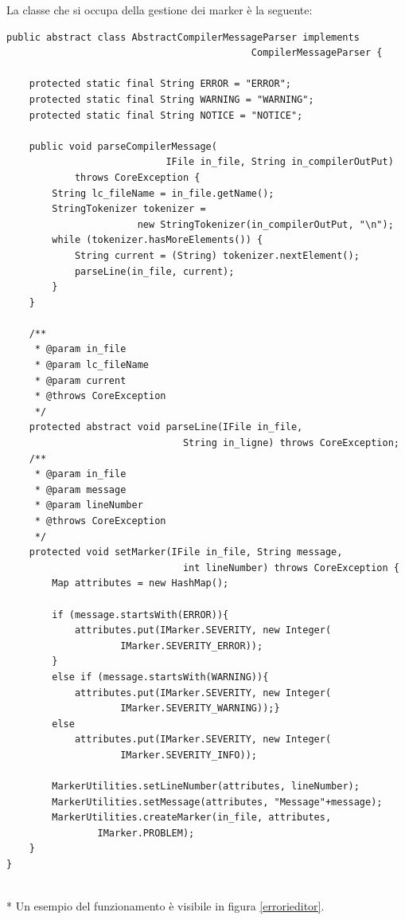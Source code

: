 La classe che si occupa della gestione dei marker è la seguente:

\begin{lstlisting}[caption={AbstractCompilerMessageParser}, style={java}]
public abstract class AbstractCompilerMessageParser implements 
                                           CompilerMessageParser {

    protected static final String ERROR = "ERROR"; 
    protected static final String WARNING = "WARNING";
    protected static final String NOTICE = "NOTICE"; 

    public void parseCompilerMessage(
                            IFile in_file, String in_compilerOutPut)
            throws CoreException {
        String lc_fileName = in_file.getName();
        StringTokenizer tokenizer =  
                       new StringTokenizer(in_compilerOutPut, "\n"); 
        while (tokenizer.hasMoreElements()) {
            String current = (String) tokenizer.nextElement();
            parseLine(in_file, current);
        }
    }

    /**
     * @param in_file
     * @param lc_fileName
     * @param current
     * @throws CoreException
     */
    protected abstract void parseLine(IFile in_file, 
                               String in_ligne) throws CoreException;
    /**
     * @param in_file
     * @param message
     * @param lineNumber
     * @throws CoreException
     */
    protected void setMarker(IFile in_file, String message, 
                               int lineNumber) throws CoreException {
        Map attributes = new HashMap();
    
        if (message.startsWith(ERROR)){
        	attributes.put(IMarker.SEVERITY, new Integer(
                    IMarker.SEVERITY_ERROR));
        }
        else if (message.startsWith(WARNING)){
            attributes.put(IMarker.SEVERITY, new Integer(
                    IMarker.SEVERITY_WARNING));}
        else
            attributes.put(IMarker.SEVERITY, new Integer(
                    IMarker.SEVERITY_INFO));
    
        MarkerUtilities.setLineNumber(attributes, lineNumber);
        MarkerUtilities.setMessage(attributes, "Message"+message);
        MarkerUtilities.createMarker(in_file, attributes,
                IMarker.PROBLEM);
    }
}

\end{lstlisting}
\\*
Un esempio del funzionamento è visibile in figura \ref{errorieditor}.

